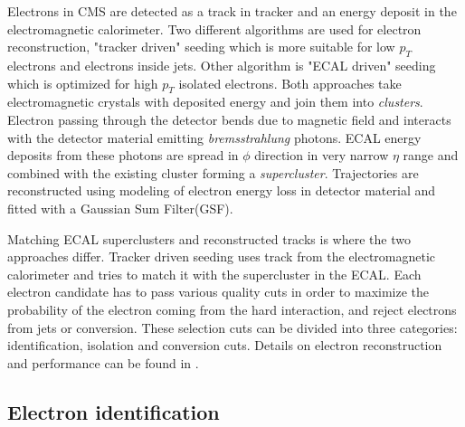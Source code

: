 Electrons in CMS are detected as a track in tracker and an energy deposit in the electromagnetic calorimeter. Two different algorithms are used for electron reconstruction, "tracker driven" seeding which is more suitable for low $p_T$ electrons and electrons inside jets. Other algorithm is "ECAL driven" seeding which is optimized for high $p_T$ isolated electrons. Both approaches take electromagnetic crystals with deposited energy and join them into \textit{clusters}. Electron passing through the detector bends due to magnetic field and interacts with the detector material emitting \textit{bremsstrahlung} photons. ECAL energy deposits from these photons are spread in $\phi$ direction in very narrow $\eta$ range and combined with the existing cluster forming a \textit{supercluster}. Trajectories are reconstructed using modeling of electron energy loss in detector material and fitted with a Gaussian Sum Filter(GSF)\cite{2005JPhG31N9A}.
\par Matching ECAL superclusters and reconstructed tracks is where the two approaches differ. Tracker driven seeding uses track from the electromagnetic calorimeter and tries to match it with the supercluster in the ECAL.   
Each electron candidate has to pass various quality cuts in order to maximize the probability of the electron coming from the hard interaction, and reject electrons from jets or conversion. These selection cuts can be divided into three categories: identification, isolation and conversion cuts. Details on electron reconstruction and performance can be found in \cite{CMS:2010bta}.

\subsection{Electron identification}

